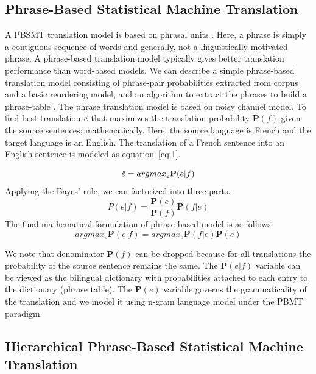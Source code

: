 \documentclass[conference]{IEEEtran}
\begin{document}
\subsection {Phrase-Based Statistical Machine Translation}
\label{subsec:PBSMT}
A PBSMT translation model is based on phrasal units \cite{b1}. Here, a phrase is simply a contiguous sequence of words and generally, not a linguistically motivated phrase. A phrase-based translation model typically gives better translation performance than word-based models. We can describe a simple phrase-based translation model consisting of phrase-pair probabilities extracted from corpus and a basic reordering model, and an algorithm to extract the phrases to build a phrase-table \cite{b14}. 
The phrase translation model is based on noisy channel model. To find best translation $ \Hat{e} $ 
that maximizes the translation probability $ \mathbf{P}(f) $ given the source sentences; mathematically. Here, the source language is French and the target language is an English. The translation of a French sentence  into an English sentence  is modeled as equation~\ref{eq:1}.

\begin{equation} \label{eq:1}
\Hat{e}=argmax_e \mathbf {P}(e|f)
\end{equation}
Applying the Bayes’ rule, we can factorized into three parts.
\begin{equation} \label{eq:2}
P(e|f)=\frac{\mathbf{P}(e)}{\mathbf{P}(f)}\mathbf{P}(f|e)
\end{equation}
The final mathematical formulation of phrase-based model is  as follows:
\begin{equation} \label{eq:3}
argmax_e \mathbf {P}(e|f)=argmax_e \mathbf {P}(f|e) \mathbf{P}(e)
\end{equation}

We note that denominator $\mathbf{P}(f)$ can be dropped because for all translations the probability of the source sentence remains the same. The $\mathbf {P}(e|f)$ variable can be viewed as the bilingual dictionary with probabilities attached to each entry to the dictionary (phrase table). The $\mathbf{P}(e)$ variable governs the grammaticality of the translation and we model it using n-gram language model under the PBMT paradigm.

\subsection {Hierarchical Phrase-Based Statistical Machine Translation}
\label{subsec:HPBSMT}
\end{document}
